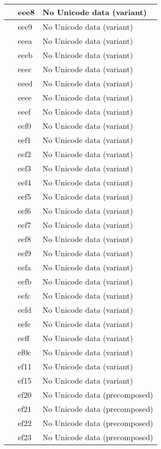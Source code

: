 \documentclass[12pt,letterpaper,openany]{book}
\begin{document}
\begin{center}
\begin{supertabular}{|m{0.25in}|m{0.5in}|m{4in}|}
 & eee8 & No Unicode data (variant)\\\hline
 & eee9 & No Unicode data (variant)\\\hline
 & eeea & No Unicode data (variant)\\\hline
 & eeeb & No Unicode data (variant)\\\hline
 & eeec & No Unicode data (variant)\\\hline
 & eeed & No Unicode data (variant)\\\hline
 & eeee & No Unicode data (variant)\\\hline
 & eeef & No Unicode data (variant)\\\hline
 & eef0 & No Unicode data (variant)\\\hline
 & eef1 & No Unicode data (variant)\\\hline
 & eef2 & No Unicode data (variant)\\\hline
 & eef3 & No Unicode data (variant)\\\hline
 & eef4 & No Unicode data (variant)\\\hline
 & eef5 & No Unicode data (variant)\\\hline
 & eef6 & No Unicode data (variant)\\\hline
 & eef7 & No Unicode data (variant)\\\hline
 & eef8 & No Unicode data (variant)\\\hline
 & eef9 & No Unicode data (variant)\\\hline
 & eefa & No Unicode data (variant)\\\hline
 & eefb & No Unicode data (variant)\\\hline
 & eefc & No Unicode data (variant)\\\hline
 & eefd & No Unicode data (variant)\\\hline
 & eefe & No Unicode data (variant)\\\hline
 & eeff & No Unicode data (variant)\\\hline
 & ef0c & No Unicode data (variant)\\\hline
 & ef11 & No Unicode data (variant)\\\hline
 & ef15 & No Unicode data (variant)\\\hline
 & ef20 & No Unicode data (precomposed)\\\hline
 & ef21 & No Unicode data (precomposed)\\\hline
 & ef22 & No Unicode data (precomposed)\\\hline
 & ef23 & No Unicode data (precomposed)\\\hline

\end{supertabular}
\end{center}
\end{document}
